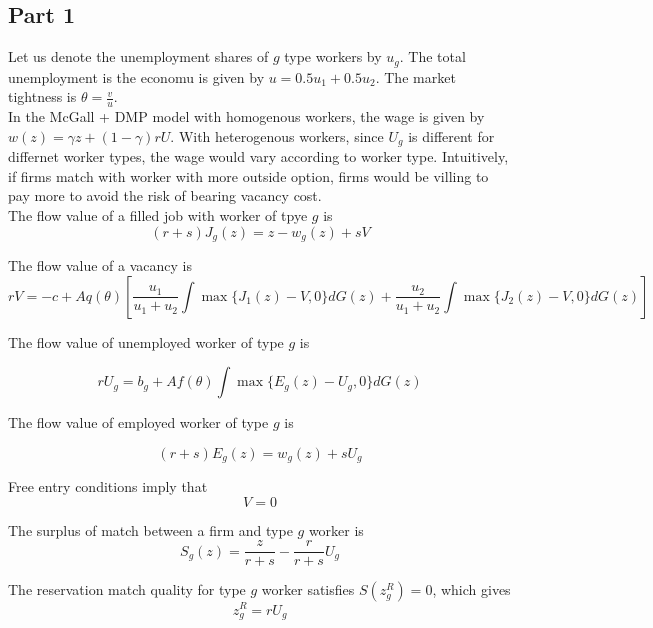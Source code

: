 \subsection*{Part 1}

Let us denote the unemployment shares of $g$ type workers by $u_g$. The total unemployment is the economu is given by $u = 0.5 u_1 + 0.5u_2$. The market tightness is $\theta = \frac{v}{u}$. \\ 

In the McGall + DMP model with homogenous workers, the wage is given by $w(z) = \gamma z + (1-\gamma)rU$. With heterogenous workers, since $U_g$ is different for differnet worker types, the wage would vary according to worker type. Intuitively, if firms match with worker with more outside option, firms would be villing to pay more to avoid the risk of bearing vacancy cost. \\

The flow value of a filled job with worker of tpye $g$ is 
\begin{equation}
    (r+s) J_g(z)  = z - w_g(z) + sV
\end{equation}

The flow value of a vacancy is 
\begin{equation}
    rV = -c + A q(\theta)\left[ \frac{u_1}{u_1 + u_2}\int \max\{J_1(z)-V, 0\}dG(z)  + \frac{u_2}{u_1 + u_2}\int \max\{J_2(z)-V, 0\}dG(z) \right]
\end{equation}

The flow value of unemployed worker of type $g$ is 

\begin{equation}
    rU_g = b_g + A f(\theta) \int \max\{E_g(z)-U_g, 0\}dG(z)
\end{equation}

The flow value of employed worker of type $g$ is 

\begin{equation}
    (r+s)E_g(z) = w_g(z) + sU_g
\end{equation}

Free entry conditions imply that $$V = 0$$

The surplus of match between a firm and type $g$ worker is
\begin{equation}
    S_g(z) = \frac{z}{r+s} - \frac{r}{r+s}U_g
\end{equation}

The reservation match quality for type $g$ worker satisfies $S(z^R_g) = 0$, which gives 
$$z^R_g = rU_g$$

